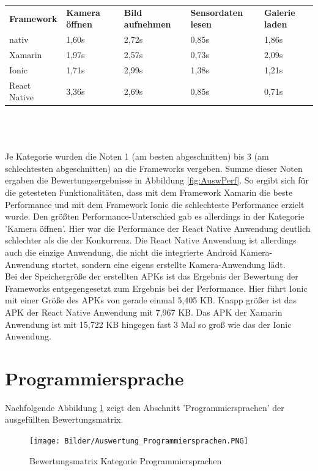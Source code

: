 \begin{tabular}{lllll}
\textbf{Framework} & \textbf{Kamera öffnen} & \textbf{Bild aufnehmen} & \textbf{Sensordaten lesen} & \textbf{Galerie laden}\\
nativ & 1,60s & 2,72s & 0,85s & 1,86s\\
Xamarin & 1,97s & 2,57s & 0,73s & 2,09s\\
Ionic & 1,71s & 2,99s & 1,38s & 1,21s\\
React Native & 3,36s & 2,69s & 0,85s & 0,71s\\
\end{tabular}
\\
\\
\\
Je Kategorie wurden die Noten 1 (am besten abgeschnitten) bis 3 (am schlechtesten abgeschnitten) an die Frameworks vergeben. Summe dieser Noten ergaben die Bewertungsergebnisse in Abbildung \ref{fig:AuswPerf}. So ergibt sich für die getesteten Funktionalitäten, dass mit dem Framework Xamarin die beste Performance und mit dem Framework Ionic die schlechteste Performance erzielt wurde. Den größten Performance-Unterschied gab es allerdings in der Kategorie 'Kamera öffnen'. Hier war die Performance der React Native Anwendung deutlich schlechter als die der Konkurrenz. Die React Native Anwendung ist allerdings auch die einzige Anwendung, die nicht die integrierte Android Kamera-Anwendung startet, sondern eine eigens erstellte Kamera-Anwendung lädt. 
\\
Bei der Speichergröße der erstellten APKs ist das Ergebnis der Bewertung der Frameworks entgegengesetzt zum Ergebnis bei der Performance. Hier führt Ionic mit einer Größe des APKs von gerade einmal 5,405 KB. Knapp größer ist das APK der React Native Anwendung mit 7,967 KB. Das APK der Xamarin Anwendung ist mit 15,722 KB hingegen fast 3 Mal so groß wie das der Ionic Anwendung. 


\section{Programmiersprache}

Nachfolgende Abbildung \ref{fig:AuswProgr} zeigt den Abschnitt 'Programmiersprachen' der ausgefüllten Bewertungsmatrix.

\begin{figure}[h]
	\centering
	\texttt{[image: Bilder/Auswertung\_Programmiersprachen.PNG]}
	\caption{Bewertungsmatrix Kategorie Programmiersprachen}
	\label{fig:AuswProgr}
\end{figure}

